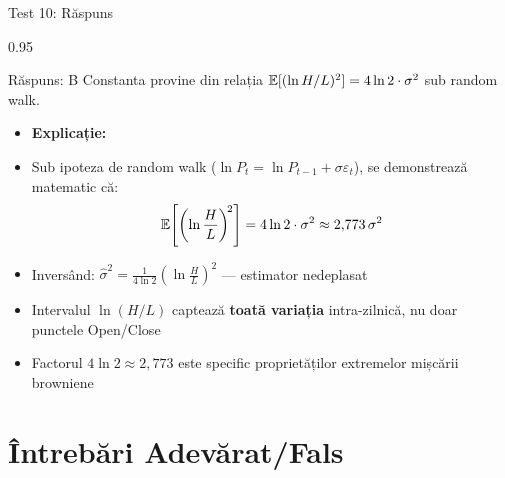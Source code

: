 \documentclass[9pt, aspectratio=169, t]{beamer}
\begin{document}
\begin{frame}[shrink=10]{Test 10: Răspuns}
\begin{cminipage}{0.95\textwidth}
    \begin{exampleblock}{Răspuns: B}
        Constanta provine din relația $\mathbb{E}[(\ln H/L)^2] = 4\ln 2 \cdot \sigma^2$ sub random walk.
    \end{exampleblock}
    \vspace{0.2cm}
    \begin{itemize}\setlength{\itemsep}{0pt}
        \item \textbf{Explicație:}
        \item Sub ipoteza de random walk ($\ln P_t = \ln P_{t-1} + \sigma\varepsilon_t$), se demonstrează matematic că:
        $$\mathbb{E}\!\left[\left(\ln\frac{H}{L}\right)^{\!2}\right] = 4\ln 2 \cdot \sigma^2 \approx 2{,}773\,\sigma^2$$
        \item Inversând: $\hat{\sigma}^2 = \frac{1}{4\ln 2}\left(\ln\frac{H}{L}\right)^{\!2}$ --- estimator nedeplasat
        \item Intervalul $\ln(H/L)$ captează \textbf{toată variația} intra-zilnică, nu doar punctele Open/Close
        \item Factorul $4\ln 2 \approx 2{,}773$ este specific proprietăților extremelor mișcării browniene
    \end{itemize}
\end{cminipage}
\end{frame}

\section{Întrebări Adevărat/Fals}
\end{document}
